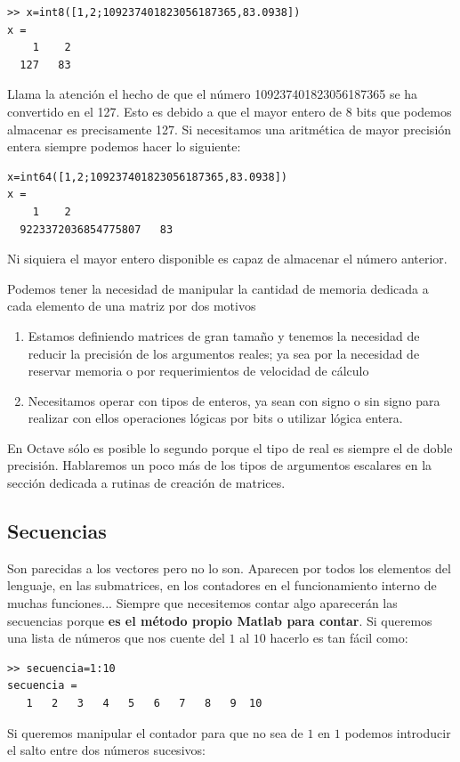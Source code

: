 \begin{lstlisting}
>> x=int8([1,2;109237401823056187365,83.0938])
x =
    1    2
  127   83
\end{lstlisting}
Llama la atención el hecho de que el número 109237401823056187365 se
ha convertido en el 127. Esto es debido a que el mayor entero de 8
bits que podemos almacenar es precisamente 127. Si necesitamos una
aritmética de mayor precisión entera siempre podemos hacer lo
siguiente:

\begin{lstlisting}
x=int64([1,2;109237401823056187365,83.0938])
x =
    1    2
  9223372036854775807   83
\end{lstlisting}
Ni siquiera el mayor entero disponible es capaz de almacenar el número
anterior.
 
Podemos tener la necesidad de manipular la cantidad de memoria
dedicada a cada elemento de una matriz por dos motivos

\begin{enumerate}
\item Estamos definiendo matrices de gran tamaño y tenemos la
  necesidad de reducir la precisión de los argumentos reales; ya sea
  por la necesidad de reservar memoria o por requerimientos de
  velocidad de cálculo
\item Necesitamos operar con tipos de enteros, ya sean con signo o sin
  signo para realizar con ellos operaciones lógicas por bits o utilizar
  lógica entera.
\end{enumerate}
En Octave sólo es posible lo segundo porque el tipo de real es siempre
el de doble precisión. Hablaremos un poco más de los tipos de
argumentos escalares en la sección dedicada a rutinas de creación de
matrices.


\subsection{Secuencias\label{sub:Secuencias}}

Son parecidas a los vectores pero no lo son. Aparecen por todos los
elementos del lenguaje, en las submatrices, en los contadores en el
funcionamiento interno de muchas funciones... Siempre que necesitemos
contar algo aparecerán las secuencias porque \textbf{es el método
  propio Matlab para contar}. Si queremos una lista de números que nos
cuente del $1$ al $10$ hacerlo es tan fácil como:

\begin{lstlisting}
>> secuencia=1:10
secuencia =
   1   2   3   4   5   6   7   8   9  10
\end{lstlisting}
Si queremos manipular el contador para que no sea de $1$ en $1$
podemos introducir el salto entre dos números sucesivos:

